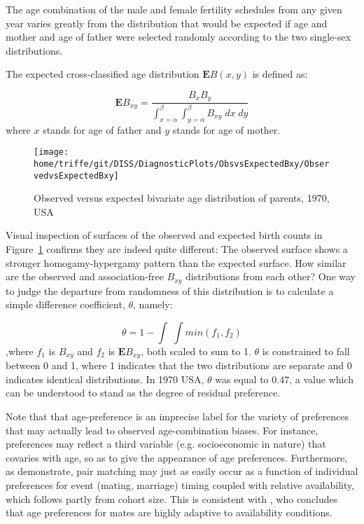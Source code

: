 
The age combination of the male and female fertility schedules from
any given year varies greatly from the distribution that would be expected if
age and mother and age of father were selected randomly according to the two
single-sex distributions.

The expected cross-classified age distribution $\textbf{E}B(x,y)$ is defined as:

\begin{equation}
\textbf{E}B_{xy} = \frac{B_x B_y}{\int _{x = \alpha} ^\beta \int _{y = \alpha}
^\beta B_{xy} \; dx \;dy}
\end{equation}
where $x$ stands for age of father and $y$ stands for age of mother.

\begin{figure}
        \centering  
          \caption{Observed versus expected bivariate age distribution of
          parents, 1970, USA}
          \texttt{[image: home/triffe/git/DISS/DiagnosticPlots/ObsvsExpectedBxy/ObservedvsExpectedBxy]}
          \label{fig:US1970obsexp}
\end{figure}

Visual inspection of surfaces of the observed and expected birth counts in
Figure~\ref{fig:US1970obsexp} confirms they are indeed quite different: The
observed surface shows a stronger homogamy-hypergamy pattern than the expected surface. How similar are the
observed and association-free $B_{xy}$ distributions from each other? One way to
judge the departure from randomness of this distribution is to calculate a
simple difference coefficient, $\theta$, namely:

\begin{equation}
\theta = 1 - \int \;\int min(f_1, f_2)
\end{equation}
,where $f_1$ is $B_{xy}$ and $f_2$ is $\textbf{E}B_{xy}$, both scaled to sum to
1. $\theta$ is constrained to fall between 0 and 1, where 1 indicates that the
two distributions are separate and 0 indicates identical distributions. In 1970 USA,
$\theta$ was equal to $0.47$, a value which can be understood to stand as the
degree of residual preference.

Note that that age-preference is an imprecise label for the variety
of preferences that may actually lead to observed age-combination biases. For
instance, preferences may reflect a third variable (e.g. socioeconomic
in nature) that covaries with age, so as to give the appearance of age
preferences. Furthermore, as \citet{bergstrom1994sweden}
demonstrate, pair matching may just as easily occur as a function of individual
preferences for event (mating, marriage) timing coupled with relative
availability, which follows partly from cohort size. This is consistent with
\citet{bhrolchain2001flexibility}, who concludes that age preferences for
mates are highly adaptive to availability conditions.

